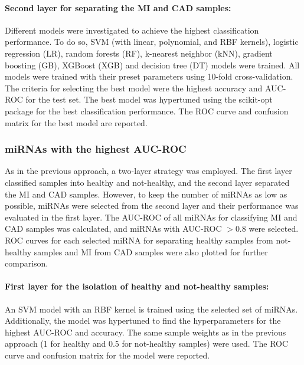 \documentclass[sn-mathphys,Numbered]{sn-jnl}%
\theoremstyle{thmstyleone}%
\theoremstyle{thmstyletwo}%
\theoremstyle{thmstylethree}%
\begin{document}
\paragraph{Second layer for separating the MI and CAD
samples:}\label{second-layer-for-separating-the-mi-and-cad-samples}

Different models were investigated to achieve the highest classification
performance. To do so, SVM (with linear, polynomial, and RBF kernels),
logistic regression (LR), random forests (RF), k-nearest neighbor (kNN),
gradient boosting (GB), XGBoost (XGB) and decision tree (DT) models were
trained. All models were trained with their preset parameters using
10-fold cross-validation. The criteria for selecting the best model were
the highest accuracy and AUC-ROC for the test set. The best model was
hypertuned using the scikit-opt package \cite{scikitopt} for the best
classification performance. The ROC curve and confusion matrix for the
best model are reported.


\subsubsection{miRNAs with the highest
AUC-ROC}\label{mirnas-with-the-highest-auc-roc}

As in the previous approach, a two-layer strategy was employed. The
first layer classified samples into healthy and not-healthy, and the
second layer separated the MI and CAD samples. However, to keep the
number of miRNAs as low as possible, miRNAs were selected from the
second layer and their performance was evaluated in the first layer. The
AUC-ROC of all miRNAs for classifying MI and CAD samples was calculated,
and miRNAs with AUC-ROC $> 0.8$ were selected. ROC curves for each
selected miRNA for separating healthy samples from not-healthy samples
and MI from CAD samples were also plotted for further comparison.


\paragraph{First layer for the isolation of healthy and not-healthy
samples:}\label{first-layer-for-the-isolation-of-healthy-and-not-healthy-samples-1}

An SVM model with an RBF kernel is trained using the selected set of
miRNAs. Additionally, the model was hypertuned to find the
hyperparameters for the highest AUC-ROC and accuracy. The same sample
weights as in the previous approach (1 for healthy and 0.5 for
not-healthy samples) were used. The ROC curve and confusion matrix for
the model were reported.
\end{document}
